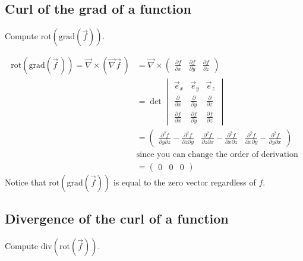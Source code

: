   \subsection{Curl of the grad of a function}
  Compute $\text{rot}(\text{grad}(\vec f))$.

  \begin{align*}
  \text{rot}(\text{grad}(\vec f \,)) = \vec\nabla \times \left(\vec\nabla \vec f\,\right)
    & =
      \vec\nabla \times
      \begin{pmatrix}
        \frac{\partial f}{\partial x} &
        \frac{\partial f}{\partial y} &
        \frac{\partial f}{\partial z}
      \end{pmatrix} \\
    & = \det
      \begin{vmatrix}
        \vec e_x & \vec e_y & \vec e_z \\[6pt]
        \frac{\partial}{\partial x} &
        \frac{\partial}{\partial y} &
        \frac{\partial}{\partial z} \\[6pt]
        \frac{\partial f}{\partial x} &
        \frac{\partial f}{\partial y} &
        \frac{\partial f}{\partial z}
      \end{vmatrix} \\
    & =
      \begin{pmatrix}
        \frac{\partial^2 f}{\partial y \partial z} - \frac{\partial^2 f}{\partial z \partial y} &
        \frac{\partial^2 f}{\partial z \partial x} - \frac{\partial^2 f}{\partial x \partial z} &
        \frac{\partial^2 f}{\partial x \partial y} - \frac{\partial^2 f}{\partial y \partial x}
      \end{pmatrix} \\
    & \text{since you can change the order of derivation} \\
    & =
      \begin{pmatrix}
        0 & 0 & 0
      \end{pmatrix}
  \end{align*}
  Notice that $\text{rot}(\text{grad}(\vec f))$ is equal to the zero vector regardless of $f$.

  \subsection{Divergence of the curl of a function}
  Compute $\text{div}(\text{rot}(\vec f))$.

